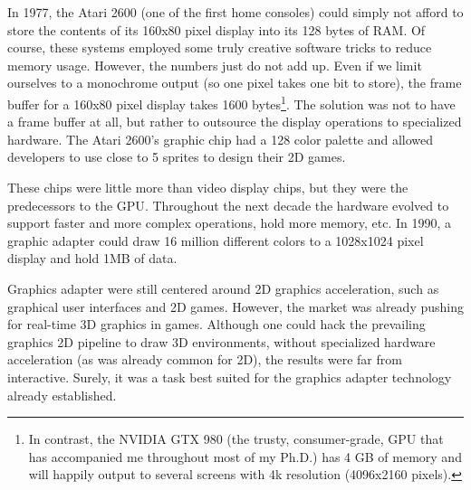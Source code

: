 \documentclass[ twoside,openright,titlepage,numbers=noenddot,%
headinclude,footinclude,cleardoublepage=empty,abstract=on,
BCOR=5mm,paper=a4,fontsize=11pt, dvipsnames
]{scrreprt}
\newcommand{\gpu}{\gls{GPU}\xspace}
\begin{document}
In 1977, the Atari 2600 (one of the first home consoles) could simply not afford to store the contents of its 160x80 pixel display into its 128 bytes of RAM. Of course, these systems employed some truly creative software tricks to reduce memory usage. However, the numbers just do not add up. Even if we limit ourselves to a monochrome output (so one pixel takes one bit to store), the frame buffer for a 160x80 pixel display takes 1600 bytes\footnote{In contrast, the NVIDIA GTX 980 (the trusty, consumer-grade, GPU that has accompanied me throughout most of my Ph.D.) has 4 GB of memory and will happily output to several screens with 4k resolution (4096x2160 pixels).}.
The solution was not to have a frame buffer at all, but rather to outsource the display operations to specialized hardware. The Atari 2600's graphic chip had a 128 color palette and allowed developers to use close to 5 sprites to design their 2D games.

These chips were little more than video display chips, but they were the predecessors to the \gpu.
Throughout the next decade the hardware evolved to support faster and more complex operations, hold more memory, etc. In 1990, a graphic adapter could draw 16 million different colors to a 1028x1024 pixel display and hold 1MB of data.

Graphics adapter were still centered around 2D graphics acceleration, such as graphical user interfaces and 2D games. However, the market was already pushing for real-time 3D graphics in games. Although one could hack the prevailing graphics 2D pipeline to draw 3D environments, without specialized hardware acceleration (as was already common for 2D), the results were far from interactive. Surely, it was a task best suited for the graphics adapter technology already established.
\end{document}
